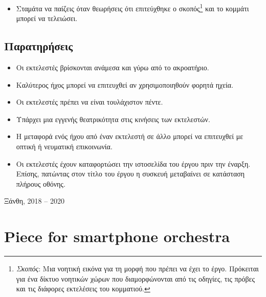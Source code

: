 \documentclass[11pt,letterpage]{book}
\begin{document}
\begin{itemize}
\begin{center}
  \end{center}
\item Σταμάτα να παίζεις όταν θεωρήσεις ότι επιτεύχθηκε ο σκοπός\footnote{\textit{Σκοπός}: Μια νοητική εικόνα για τη μορφή που πρέπει να έχει το έργο.
    Πρόκειται για ένα δίκτυο νοητικών χώρων που διαμορφώνονται από τις οδηγίες, τις πρόβες και τις διάφορες εκτελέσεις του κομματιού.}
  και το κομμάτι μπορεί να τελειώσει.
\end{itemize}
\section*{Παρατηρήσεις}
\begin{itemize}
\item Οι εκτελεστές βρίσκονται ανάμεσα και γύρω από το ακροατήριο.
\item Καλύτερος ήχος μπορεί να επιτευχθεί αν χρησιμοποιηθούν φορητά ηχεία.
\item Οι εκτελεστές πρέπει να είναι τουλάχιστον πέντε.
\item Υπάρχει μια εγγενής θεατρικότητα στις κινήσεις των εκτελεστών.
\item Η μεταφορά ενός ήχου από έναν εκτελεστή σε άλλο μπορεί να επιτευχθεί με οπτική ή νευματική επικοινωνία.
\item Οι εκτελεστές έχουν καταφορτώσει την ιστοσελίδα του έργου πριν την έναρξη. Επίσης, πατώντας στον τίτλο του έργου η συσκευή μεταβαίνει σε κατάσταση πλήρους οθόνης.
\end{itemize}
{\footnotesize\phantom{}\hfill Ξάνθη, 2018 -- 2020}

\newpage

\chapter*{Piece for smartphone orchestra}
\end{document}
